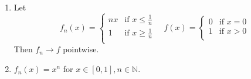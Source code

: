\documentclass[a4paper]{article}
\begin{document}
\begin{example}\
    \begin{enumerate}
        \item Let 
        \[
            f_n(x) = \begin{cases}
            nx &\text{if }x\le \frac{1}{n}\\
            1 &\text{if }x\ge \frac{1}{n}\\
            \end{cases} \quad f(x) = \begin{cases}
            0 &\text{if }x=0\\
            1 &\text{if }x>0\\
            \end{cases} 
        \]
        Then $f_n\to f$ pointwise. 
        \item $f_{n}(x)=x^{n}$ for $x \in[0,1], n \in \mathbb{N}$.
        

\end{enumerate}
\end{example}
\end{document}
